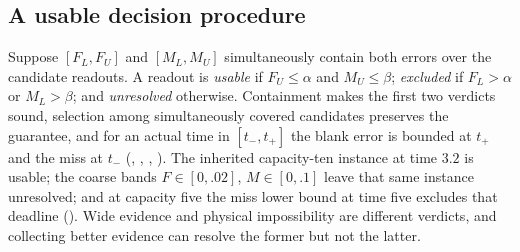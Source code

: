 \documentclass[11pt,a4paper]{article}
\theoremstyle{plain}
\theoremstyle{definition}
\theoremstyle{remark}
\begin{document}
\subsection{A usable decision procedure}\label{sec:procedure}
Suppose $[F_L,F_U]$ and $[M_L,M_U]$ simultaneously contain both errors over the candidate readouts. A readout is \emph{usable} if $F_U\le\alpha$ and $M_U\le\beta$; \emph{excluded} if $F_L>\alpha$ or $M_L>\beta$; and \emph{unresolved} otherwise. Containment makes the first two verdicts sound, selection among simultaneously covered candidates preserves the guarantee, and for an actual time in $[t_-,t_+]$ the blank error is bounded at $t_+$ and the miss at $t_-$ (, , , ). The inherited capacity-ten instance at time $3.2$ is usable; the coarse bands $F\in[0,.02]$, $M\in[0,.1]$ leave that same instance unresolved; and at capacity five the miss lower bound at time five excludes that deadline (). Wide evidence and physical impossibility are different verdicts, and collecting better evidence can resolve the former but not the latter.
\end{document}
